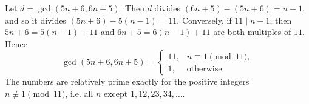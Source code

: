 Let $d=\gcd(5n+6,6n+5)$. Then $d$ divides $(6n+5)-(5n+6)=n-1$, and so it divides $(5n+6)-5(n-1)=11$. Conversely, if $11\mid n-1$, then $5n+6=5(n-1)+11$ and $6n+5=6(n-1)+11$ are both multiples of $11$. Hence
\[
\gcd(5n+6,6n+5)=\begin{cases}11,&n\equiv1\pmod{11},\\ 1,&\text{otherwise.}\end{cases}
\]
The numbers are relatively prime exactly for the positive integers $\boxed{n\not\equiv1\pmod{11}}$, i.e. all $n$ except $1,12,23,34,\dots$.
